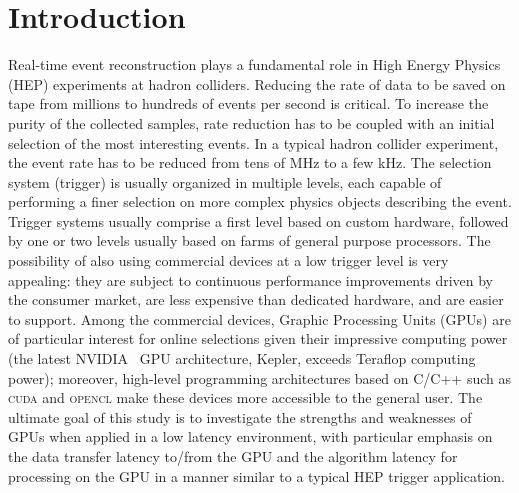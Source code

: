 \documentclass[letterpaper]{jpconf}
\begin{document}
\section{Introduction}
Real-time event reconstruction plays a fundamental role in High Energy
Physics (HEP) experiments at hadron colliders.  Reducing the rate of
data to be saved on tape from millions to hundreds of events per
second is critical. To increase the purity of the collected samples,
rate reduction has to be coupled with an initial selection of the most
interesting events.  In a typical hadron collider experiment, the
event rate has to be reduced from tens of MHz to a few kHz.  The
selection system (trigger) is usually organized in multiple levels,
each capable of performing a finer selection on more complex physics
objects describing the event. Trigger systems usually comprise a first
level based on custom hardware, followed by one or two levels usually
based on farms of general purpose processors.  The possibility of also
using commercial devices at a low trigger level is very appealing:
they are subject to continuous performance improvements driven by the
consumer market, are less expensive than dedicated hardware, and are
easier to support.  Among the commercial devices, Graphic Processing
Units (GPUs) are of particular interest for online selections given
their impressive computing power (the latest NVIDIA~\cite{bib_nvidia}
GPU architecture, Kepler, exceeds Teraflop computing power); moreover,
high-level programming architectures based on C/C++ such as
\textsc{cuda} and \textsc{opencl} make these devices more accessible
to the general user.  
The ultimate goal of this study is to investigate the strengths and weaknesses
of GPUs when applied in a low latency environment, with particular
emphasis on the data transfer latency to/from the GPU and the
algorithm latency for processing on the GPU in a manner similar to a
typical HEP trigger application.
\end{document}
